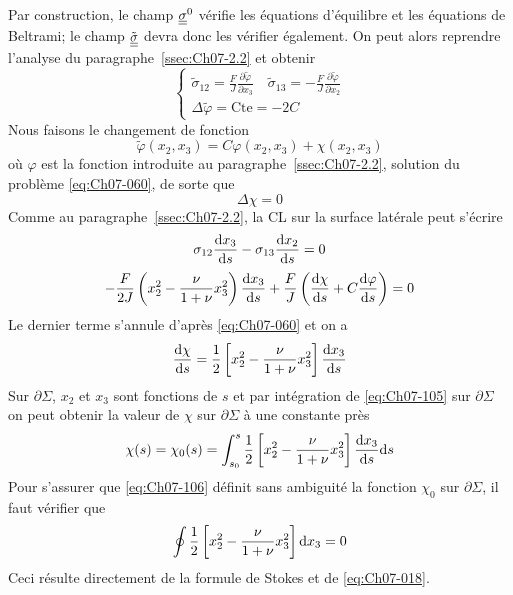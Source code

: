 Par construction, le champ $\underline{\underline{\sigma}}^0$ vérifie les équations d'équilibre 
et les équations de Beltrami; le champ $\tilde{\underline{\underline{\sigma}}}$  devra donc les vérifier également.
On peut alors reprendre l'analyse du paragraphe~\ref{ssec:Ch07-2.2} et obtenir 
\begin{equation}
    \left\{
    \begin{split}
        \tilde{\sigma}_{12} = \frac{F}{J} \frac{\partial \tilde{\varphi}}{\partial x_3} \quad \tilde{\sigma}_{13} = - \frac{F}{J} \frac{\partial \tilde{\varphi}}{\partial x_2} \\
        \Delta \tilde{\varphi} = \text{Cte} = -2C
    \end{split}
    \right.
    \label{eq:Ch07-102}
\end{equation}
Nous faisons le changement de fonction 
\begin{equation}
    \tilde{\varphi} (x_2,x_3) = C\varphi(x_2,x_3) + \chi (x_2,x_3)
    \label{eq:Ch07-103}
\end{equation}
où $\varphi$ est la fonction introduite au paragraphe~\ref{ssec:Ch07-2.2}, solution du problème \eqref{eq:Ch07-060}, de sorte que
\begin{equation}
    \Delta\chi = 0
    \label{eq:Ch07-104}
\end{equation}
Comme au paragraphe~\ref{ssec:Ch07-2.2}, la CL sur la surface latérale peut s'écrire 
\begin{displaymath}
    \sigma_{12} \frac{\mathrm{d} x_3}{\mathrm{d} s} - \sigma_{13} \frac{\mathrm{d} x_2}{\mathrm{d} s} = 0
\end{displaymath}
\begin{displaymath}
    -\frac{F}{2J} \left( x_2^2 - \frac{\nu}{1+\nu} x_3^2 \right) \frac{\mathrm{d} x_3}{\mathrm{d} s} + \frac{F}{J} \left( \frac{\mathrm{d} \chi}{\mathrm{d} s} + C \frac{\mathrm{d} \varphi}{\mathrm{d} s} \right) = 0
\end{displaymath}
Le dernier terme s'annule d'après \eqref{eq:Ch07-060} et on a 
\begin{equation}
    \frac{\mathrm{d} \chi}{\mathrm{d} s} = \frac{1}{2} \left[ x_2^2 - \frac{\nu}{1+\nu} x_3^2 \right] \frac{\mathrm{d} x_3}{\mathrm{d} s}
    \label{eq:Ch07-105}
\end{equation}
Sur $\partial \Sigma$, $x_2$ et $x_3$ sont fonctions de $s$ et par intégration de \eqref{eq:Ch07-105} sur $\partial \Sigma$ on peut obtenir la valeur de $\chi$ sur $\partial \Sigma$ à une constante près
\begin{equation}
    \chi(s) = \chi_0 (s) = \int_{s_0}^s \frac{1}{2} \left[ x_2^2 - \frac{\nu}{1+\nu} x_3^2 \right] \frac{\mathrm{d} x_3}{\mathrm{d} s} \mathrm{d} s
    \label{eq:Ch07-106}
\end{equation}
Pour s'assurer que \eqref{eq:Ch07-106} définit sans ambiguité la fonction $\chi_0$ sur $\partial \Sigma$, il faut vérifier que 
\begin{equation}
    \oint \frac{1}{2} \left[ x_2^2 - \frac{\nu}{1+\nu} x_3^2 \right]\mathrm{d} x_3 = 0
    \label{eq:Ch07-107}
\end{equation}
Ceci résulte directement de la formule de Stokes et de \eqref{eq:Ch07-018}. 

